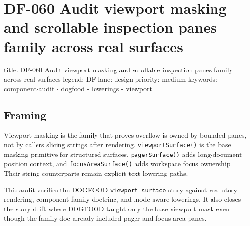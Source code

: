 \chapter{DF-060 Audit viewport masking and scrollable inspection panes family across real surfaces}\label{record-100}

\smallskip

\begin{RecordMeta}
title: DF-060 Audit viewport masking and scrollable inspection panes family across real surfaces
legend: DF
lane: design
priority: medium
keywords:
  - component-audit
  - dogfood
  - lowerings
  - viewport

\end{RecordMeta}

\section{Framing}\label{record-100-framing}

Viewport masking is the family that proves overflow is owned by bounded panes, not by callers slicing strings after rendering. \texttt{v\allowbreak{}i\allowbreak{}e\allowbreak{}w\allowbreak{}p\allowbreak{}o\allowbreak{}r\allowbreak{}t\allowbreak{}S\allowbreak{}u\allowbreak{}r\allowbreak{}f\allowbreak{}a\allowbreak{}c\allowbreak{}e\allowbreak{}(\allowbreak{})} is the base masking primitive for structured surfaces, \texttt{p\allowbreak{}a\allowbreak{}g\allowbreak{}e\allowbreak{}r\allowbreak{}S\allowbreak{}u\allowbreak{}r\allowbreak{}f\allowbreak{}a\allowbreak{}c\allowbreak{}e\allowbreak{}(\allowbreak{})} adds long-document position context, and \texttt{f\allowbreak{}o\allowbreak{}c\allowbreak{}u\allowbreak{}s\allowbreak{}A\allowbreak{}r\allowbreak{}e\allowbreak{}a\allowbreak{}S\allowbreak{}u\allowbreak{}r\allowbreak{}f\allowbreak{}a\allowbreak{}c\allowbreak{}e\allowbreak{}(\allowbreak{})} adds workspace focus ownership. Their string counterparts remain explicit text-lowering paths.

This audit verifies the DOGFOOD \texttt{v\allowbreak{}i\allowbreak{}e\allowbreak{}w\allowbreak{}p\allowbreak{}o\allowbreak{}r\allowbreak{}t\allowbreak{}-\allowbreak{}s\allowbreak{}u\allowbreak{}r\allowbreak{}f\allowbreak{}a\allowbreak{}c\allowbreak{}e} story against real story rendering, component-family doctrine, and mode-aware lowerings. It also closes the story drift where DOGFOOD taught only the base viewport mask even though the family doc already included pager and focus-area panes.

